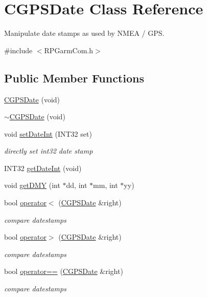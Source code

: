 \hypertarget{classCGPSDate}{
\section{CGPSDate Class Reference}
\label{classCGPSDate}
}


Manipulate date stamps as used by NMEA / GPS.  




{\ttfamily \#include $<$RPGarmCom.h$>$}

\subsection*{Public Member Functions}
\begin{DoxyCompactItemize}
\item 
\hyperlink{classCGPSDate_a39579b94285cd8157842e34bfdbc3aa8}{CGPSDate} (void)
\item 
\hyperlink{classCGPSDate_a0a571fe66f5d54e2ea0add63dc00149a}{$\sim$CGPSDate} (void)
\item 
void \hyperlink{classCGPSDate_acdb07ab1a6464d560ad170dcbc1892f9}{setDateInt} (INT32 set)
\begin{DoxyCompactList}\small\item\em directly set int32 date stamp \item\end{DoxyCompactList}\item 
INT32 \hyperlink{classCGPSDate_a9f775a354ab6e73d9d1f2e1bf50bf1fc}{getDateInt} (void)
\item 
void \hyperlink{classCGPSDate_ab53b636b4ae9e826d5487a0fddec6a2b}{getDMY} (int $\ast$dd, int $\ast$mm, int $\ast$yy)
\item 
bool \hyperlink{classCGPSDate_a40f1e0765b7c761c6a305c00a80dff9f}{operator$<$} (\hyperlink{classCGPSDate}{CGPSDate} \&right)
\begin{DoxyCompactList}\small\item\em compare datestamps \item\end{DoxyCompactList}\item 
bool \hyperlink{classCGPSDate_a780f9cc9153dac839308a127880efd2a}{operator$>$} (\hyperlink{classCGPSDate}{CGPSDate} \&right)
\begin{DoxyCompactList}\small\item\em compare datestamps \item\end{DoxyCompactList}\item 
bool \hyperlink{classCGPSDate_a547a8beed6ab62f9417aa8112f9ce6d1}{operator==} (\hyperlink{classCGPSDate}{CGPSDate} \&right)
\begin{DoxyCompactList}\small\item\em compare datestamps \item\end{DoxyCompactList}\end{DoxyCompactItemize}
